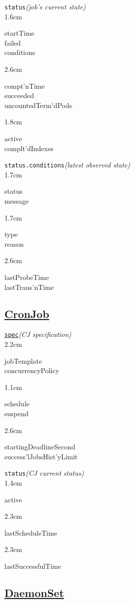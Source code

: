 \texttt{status}\quad\textit{(job's current state)}\\[-2mm]
\api
{1.6cm}{
startTime       \\
failed          \\
conditions      

}
{2.6cm}{
compt'nTime     \\
succeeded       \\
uncountedTerm'dPods 

}
{1.8cm}{
active          \\
complt'dIndexes  

}
\stopapi

\texttt{status.conditions}\quad\textit{(latest observed state)}\\[-2mm]
\api
{1.7cm}{
status      \\
message     

}
{1.7cm}{
type        \\
reason      

}
{2.6cm}{
lastProbeTime   \\
lastTrans'nTime 

}
\stopapi


\subsection*{\href{https://kubernetes.io/docs/concepts/workloads/controllers/cron-jobs/}{CronJob}}

\texttt{\href{https://kubernetes.io/docs/reference/kubernetes-api/workload-resources/cron-job-v1/}{spec}}\quad\textit{(CJ specification)}\\[-2mm]
\api
{2.2cm}{
jobTemplate         \\
concurrencyPolicy   

}
{1.1cm}{
schedule            \\
suspend 

}
{2.6cm}{
startingDeadlineSecond  \\
success'lJobsHist'yLimit 

}
\stopapi
\texttt{status}\quad\textit{(CJ current status)}\\[-2mm]
\api
{1.4cm}{
active

}
{2.3cm}{
lastScheduleTime

}
{2.3cm}{
lastSuccessfulTime

}
\stopapi


\subsection*{\href{https://kubernetes.io/docs/concepts/workloads/controllers/daemonset/}{DaemonSet}}

